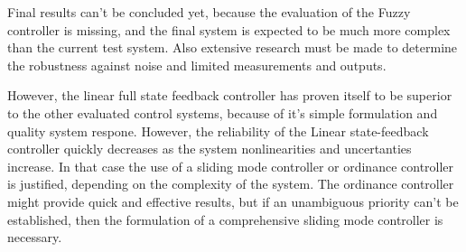 Final results can’t be concluded yet, because the evaluation of the Fuzzy controller is missing, and the final system is expected to be much more complex than the current test system. Also extensive research must be made to determine the robustness against noise and limited measurements and outputs.

However, the linear full state feedback controller has proven itself to be superior to the other evaluated control systems, because of it’s simple formulation and quality system respone. However, the reliability of the Linear state-feedback controller quickly decreases as the system nonlinearities and uncertanties increase.
In that case the use of a sliding mode controller or ordinance controller is justified, depending on the complexity of the system. The ordinance controller might provide quick and effective results, but if an unambiguous priority can’t be established, then the formulation of a comprehensive sliding mode controller is necessary.